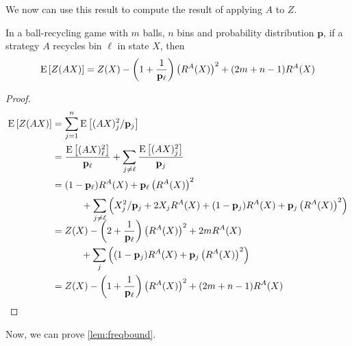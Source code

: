 We now can use this result to compute the result of applying $A$ to $Z$. 
\begin{lemma}
   In a ball-recycling game with $m$ balls, $n$ bins and probability
   distribution $\mathbf{p}$, if a strategy $A$ recycles bin $\ell$ in state
   $X$, then
   \[\mathrm{E}\left[Z(AX)\right]=Z(X) - \left(1+\frac{1}{\mathbf{p}_\ell}\right)\left(R^A(X)\right)^2 + (2m+n-1)R^A(X)\]
\end{lemma}

\begin{proof}
   \begin{align*}
      \E{Z(AX)} &= \sum_{j=1}^n \E{(AX)_j^2/\p_j} \\
		&= \frac{\E{(AX)_\ell^2}}{\p_\ell} + \sum_{j \neq \ell} \frac{\E{(AX)_j^2}}{\p_j} \\
		&= \begin{multlined}[t][6.25cm](1-\p_\ell)R^A(X) + \p_\ell\left(R^A(X)\right)^2 \\[0.75ex]
			\vspace*{-1.5ex}\shoveleft[0.25cm]{+ \sum_{j \neq \ell} \left( X_j^2/\p_j + 2X_jR^A(X)} + (1-\p_j)R^A(X) + \p_j\left(R^A(X)\right)^2 \right) \end{multlined} \\
		&= Z(X) - \left(2 + \frac{1}{\p_\ell}\right)\left(R^A(X)\right)^2 + 2mR^A(X) \\
		&\qquad\quad+ \sum_j \left((1-\p_j)R^A(X) + \p_j\left(R^A(X)\right)^2\right) \\
		&= Z(X) - \left(1+\frac{1}{\p_\ell}\right)\left(R^A(X)\right)^2 + (2m+n-1)R^A(X)
   \end{align*}
\end{proof}

Now, we can prove \cref{lem:freqbound}.

